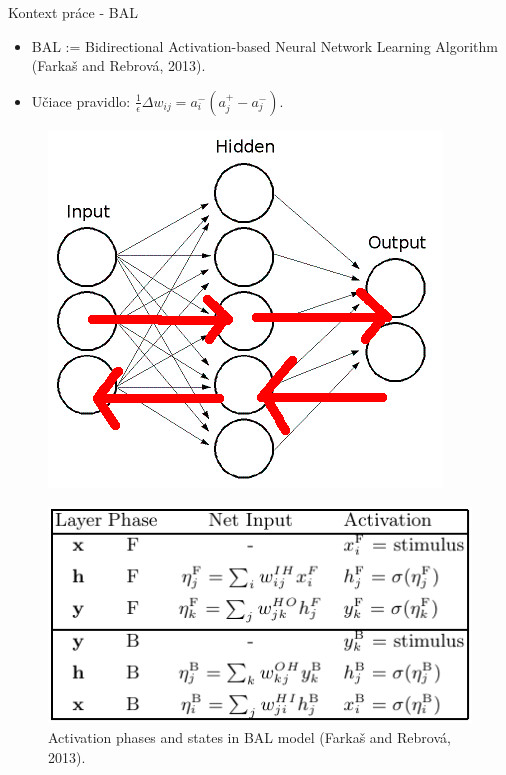 \documentclass[xcolor=dvipsnames]{beamer}
\begin{document}
\begin{frame}{Kontext práce - BAL}
  \begin{itemize}
    \item BAL := Bidirectional Activation-based Neural Network Learning Algorithm (Farkaš and Rebrová, 2013).
    \item Učiace pravidlo: $ \frac{1}{\epsilon}\Delta w_{ij} = a_{i}^{-}(a_{j}^{+} - a_{j}^{-}). $
  \end{itemize}
  
  \begin{figure}[h!]  
    \centering
    \vspace{-5pt} 
    \includegraphics[scale=0.4]{img/3_layer_network_bal.png}
  \end{figure} 
  
  \begin{figure}[h!]  
    \centering
    \vspace{-5pt} 
    \includegraphics[scale=0.4]{img/bal_activations.png}
    \vspace{-5pt} 
    \caption{{\tiny Activation phases and states in BAL model (Farkaš and Rebrová, 2013).}} 
  \end{figure} 
\end{frame}
\end{document}
